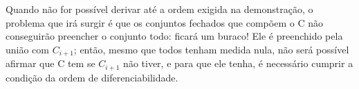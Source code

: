 \documentclass[../differential_topology.tex]{subfiles}
\begin{document}
\begin{tcolorbox}[
		skin=enhanced,
		title=Observação,
		fonttitle=\bfseries,
		colframe=black,
		colbacktitle=cyan!75!white,
		colback=cyan!15,
		colbacklower=black,
		coltitle=black,
		drop fuzzy shadow,
	]
	Quando não for possível derivar até a ordem exigida na demonstração, o problema que irá surgir é que os conjuntos fechados que compõem o C não conseguirão preencher o conjunto todo: ficará um buraco! Ele é preenchido pela união com \(C_{i+1}\); então, mesmo que todos tenham medida nula, não será possível afirmar que C tem se \(C_{i+1}\) não tiver, e para que ele tenha, é necessário cumprir a condição da ordem de diferenciabilidade.
\end{tcolorbox}
\end{document}
